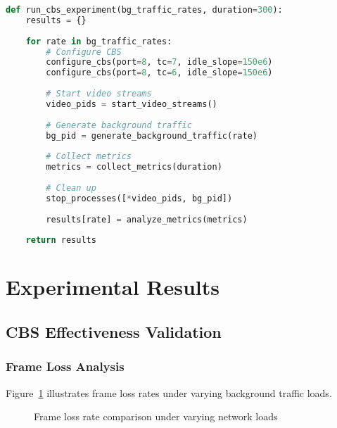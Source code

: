 \documentclass[10pt, journal, compsoc]{IEEEtran}
\begin{document}
\begin{lstlisting}[language=python, caption=Test Automation Script]
def run_cbs_experiment(bg_traffic_rates, duration=300):
    results = {}
    
    for rate in bg_traffic_rates:
        # Configure CBS
        configure_cbs(port=8, tc=7, idle_slope=150e6)
        configure_cbs(port=8, tc=6, idle_slope=150e6)
        
        # Start video streams
        video_pids = start_video_streams()
        
        # Generate background traffic
        bg_pid = generate_background_traffic(rate)
        
        # Collect metrics
        metrics = collect_metrics(duration)
        
        # Clean up
        stop_processes([*video_pids, bg_pid])
        
        results[rate] = analyze_metrics(metrics)
    
    return results
\end{lstlisting}

\section{Experimental Results}
\label{sec:results}

\subsection{CBS Effectiveness Validation}

\subsubsection{Frame Loss Analysis}

Figure~\ref{fig:frame_loss_results} illustrates frame loss rates under varying background traffic loads.

\begin{figure}[h]
\centering
{}
\caption{Frame loss rate comparison under varying network loads}
\label{fig:frame_loss_results}
\end{figure}
\end{document}
